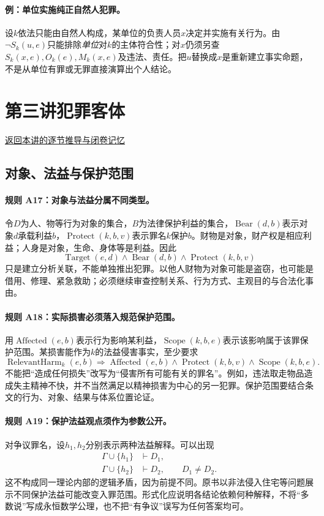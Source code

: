 \paragraph{例：单位实施纯正自然人犯罪。}
设$k$依法只能由自然人构成，某单位的负责人员$x$决定并实施有关行为。由$\neg S_k(u,e)$只能排除\emph{单位}对$k$的主体符合性；对$x$仍须另查$S_k(x,e),O_k(e),M_k(x,e)$及违法、责任。把$u$替换成$x$是重新建立事实命题，不是从单位有罪或无罪直接演算出个人结论。

\section{第三讲\quad 犯罪客体}

\label{ref:lecture:03}

\noindent\hyperref[lecture:03]{返回本讲的逐节推导与闭卷记忆}

\subsection{对象、法益与保护范围}
\paragraph{规则 A17：对象与法益分属不同类型。}
令$D$为人、物等行为对象的集合，$B$为法律保护利益的集合，$\operatorname{Bear}(d,b)$表示对象$d$承载利益$b$，$\operatorname{Protect}(k,b,v)$表示罪名$k$保护$b$。财物是对象，财产权是相应利益；人身是对象，生命、身体等是利益。因此
\[
\operatorname{Target}(e,d)\land\operatorname{Bear}(d,b)
\land\operatorname{Protect}(k,b,v)
\]
只是建立分析关联，不能单独推出犯罪。以他人财物为对象可能是盗窃，也可能是借用、修理、紧急救助；必须继续审查控制关系、行为方式、主观目的与合法化事由。

\paragraph{规则 A18：实际损害必须落入规范保护范围。}
用$\operatorname{Affected}(e,b)$表示行为影响某利益，$\operatorname{Scope}(k,b,e)$表示该影响属于该罪保护范围。某损害能作为$k$的法益侵害事实，至少要求
\[
\operatorname{RelevantHarm}_k(e,b)
\Longrightarrow\operatorname{Affected}(e,b)
\land\operatorname{Protect}(k,b,v)\land\operatorname{Scope}(k,b,e).
\]
不能把“造成任何损失”改写为“侵害所有可能有关的罪名”。例如，违法取走物品造成失主精神不快，并不当然满足以精神损害为中心的另一犯罪。保护范围要结合条文的行为、对象、结果与体系位置论证。

\paragraph{规则 A19：保护法益观点须作为参数公开。}
对争议罪名，设$h_1,h_2$分别表示两种法益解释。可以出现
\[
\begin{aligned}
\Gamma\cup\{h_1\}&\vdash D_1,\\
\Gamma\cup\{h_2\}&\vdash D_2,\qquad D_1\ne D_2.
\end{aligned}
\]
这不构成同一理论内部的逻辑矛盾，因为前提不同。原书以非法侵入住宅等问题展示不同保护法益可能改变入罪范围。形式化应说明各结论依赖何种解释，不将“多数说”写成永恒数学公理，也不把“有争议”误写为任何答案均可。

